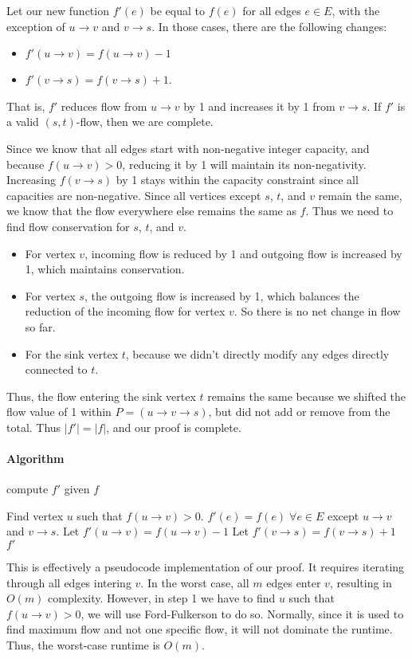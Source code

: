 \documentclass[11pt]{article}
\begin{document}
Let our new function $f'(e)$ be equal to $f(e)$ for all edges $e \in E$, with
the exception of $u \rightarrow v$ and $v \rightarrow s$. In those cases, there
are the following changes:
\begin{itemize}
    \item $f'(u \rightarrow v) = f(u \rightarrow v) - 1$
    \item $f'(v \rightarrow s) = f(v\rightarrow s) + 1$.
\end{itemize}
That is, $f'$ reduces flow from $u\rightarrow v$ by 1 and increases it by 1
from $v \rightarrow s$. If $f'$ is a valid $(s,t)$-flow, then we are complete.

Since we know that all edges start with non-negative integer capacity, and
because $f(u \rightarrow v) > 0$, reducing it by 1 will maintain its
non-negativity. Increasing $f(v \rightarrow s)$ by 1 stays within the capacity
constraint since all capacities are non-negative. Since all vertices except
$s$, $t$, and $v$ remain the same, we know that the flow everywhere else
remains the same as $f$. Thus we need to find flow conservation for $s$, $t$,
and $v$.
\begin{itemize}
    \item For vertex $v$, incoming flow is reduced by 1 and outgoing flow is
        increased by 1, which maintains conservation.
    \item For vertex $s$, the outgoing flow is increased by 1, which
        balances the reduction of the incoming flow for vertex $v$. So there is
        no net change in flow so far.
    \item For the sink vertex $t$, because we didn't directly modify any edges
        directly connected to $t$.
\end{itemize}
Thus, the flow entering the sink vertex $t$ remains the same because we shifted
the flow value of 1 within $P = (u \rightarrow v\rightarrow s)$, but did not
add or remove from the total. Thus $|f'| = |f|$, and our proof is complete.

\paragraph{Algorithm}
\begin{algorithm}
\caption{compute $f'$ given $f$}
\begin{algorithmic}[1]
    \State Find vertex $u$ such that $f(u\rightarrow v)>0$.
    \State $f'(e) = f(e) \; \forall e \in E$ except $u\rightarrow v$ and
    $v\rightarrow s$.
    \State Let $f'(u \rightarrow v) = f(u\rightarrow v) - 1$
    \State Let $f'(v\rightarrow s) = f(v\rightarrow s) + 1$
    \State \Return $f'$
\EndProcedure  
\end{algorithmic}
\end{algorithm}
This is effectively a pseudocode implementation of our proof. It requires
iterating through all edges intering $v$. In the worst case, all $m$ edges
enter $v$, resulting in $O(m)$ complexity. However, in step 1 we have to find
$u$ such that $f(u\rightarrow v)>0$, we will use Ford-Fulkerson to do so. 
Normally, since it is used to find maximum flow and not one specific flow, it
will not dominate the runtime. Thus, the worst-case runtime is $O(m)$.
\end{document}
